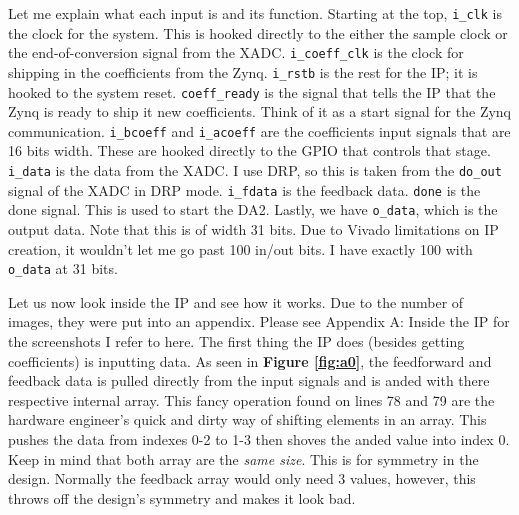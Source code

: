 \documentclass[12pt,a4paper,titlepage]{article}
\begin{document}
Let me explain what each input is and its function. Starting at the top,
\texttt{i\_clk} is the clock for the system. This is hooked directly to the
either the sample clock or the end-of-conversion signal from the
XADC. \texttt{i\_coeff\_clk} is the clock for shipping in the coefficients from
the Zynq. \texttt{i\_rstb} is the rest for the IP; it is hooked to the system
reset. \texttt{coeff\_ready} is the signal that tells the IP that the Zynq is
ready to ship it new coefficients. Think of it as a start signal for the Zynq
communication. \texttt{i\_bcoeff} and \texttt{i\_acoeff} are the coefficients
input signals that are 16 bits width. These are hooked directly to the GPIO that
controls that stage. \texttt{i\_data} is the data from the XADC. I use DRP, so
this is taken from the \texttt{do\_out} signal of the XADC in DRP
mode. \texttt{i\_fdata} is the feedback data. \texttt{done} is the done
signal. This is used to start the DA2. Lastly, we have \texttt{o\_data}, which
is the output data. Note that this is of width 31 bits. Due to Vivado
limitations on IP creation, it wouldn't let me go past 100 in/out bits. I have
exactly 100 with \texttt{o\_data} at 31 bits.

Let us now look inside the IP and see how it works. Due to the number of images,
they were put into an appendix. Please see Appendix A: Inside the IP for the
screenshots I refer to here. The first thing the IP does (besides getting
coefficients) is inputting data. As seen in \textbf{Figure \ref{fig:a0}}, the
feedforward and feedback data is pulled directly from the input signals and
is anded with there respective internal array. This fancy operation found on
lines 78 and 79 are the hardware engineer's quick and dirty way of shifting
elements in an array. This pushes the data from indexes 0-2 to 1-3 then shoves
the anded value into index 0. Keep in mind that both array are the \emph{same
  size}. This is for symmetry in the design. Normally the feedback array would
only need 3 values, however, this throws off the design's symmetry and makes it
look bad.
\end{document}
